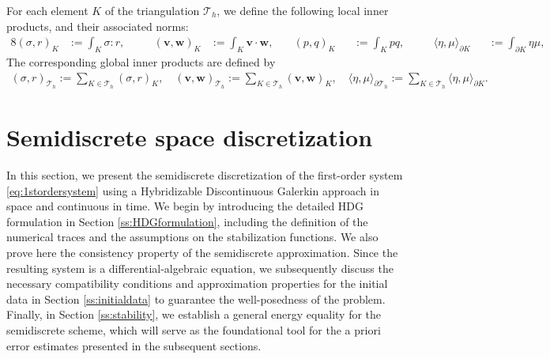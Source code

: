 \documentclass[10pt,letterpaper]{amsart}
\theoremstyle{plain} %
\theoremstyle{remark} %
\newcommand{\vect}[1]{\mathbf{#1}}
\newcommand{\Th}{\mathcal{T}_h} %
\newcommand{\Kprod}[2]{( #1, #2 )_{K}}
\newcommand{\pKprod}[2]{\langle #1, #2 \rangle_{\partial K}}
\newcommand{\Thprod}[2]{( #1, #2 )_{\mathcal{T}_h}}
\newcommand{\pThprod}[2]{\langle #1, #2 \rangle_{\partial \mathcal{T}_{h}}}
\begin{document}
For each element $K$ of the triangulation $\Th$, we define the following local inner products, and their associated norms:
\begin{alignat*}{8}
	\Kprod{\sigma}{r} &:= \int_K \sigma : r, 
	&&\quad
	\Kprod{\vect{v}}{\vect{w}} &:= \int_K \vect{v} \cdot \vect{w}, 
	&\quad
	\Kprod{p}{q} &&:= \int_K p q , 
	&&\quad
	\pKprod{\eta}{\mu}&&:= \int_{\partial K} \eta \mu,
	&&\quad
\end{alignat*}
The corresponding global inner products are defined by
\begin{align*}
	\Thprod{\sigma}{r} :=
	\sum_{K \in \Th} \Kprod{\sigma}{r}, \quad
	\Thprod{\vect{v}}{\vect{w}} := \sum_{K \in \Th} \Kprod{\vect{v}}{\vect{w}}, \quad
	\pThprod{\eta}{\mu}:=
	\sum_{K \in \Th} \pKprod{\eta}{\mu}.
\end{align*}




\section{Semidiscrete space discretization}
\label{sec:semidiscrete-discretization}

{
In this section, we present the semidiscrete discretization of the first-order system \eqref{eq:1stordersystem} using a Hybridizable Discontinuous Galerkin approach in space and continuous in time. We begin by introducing the detailed HDG formulation in Section \ref{ss:HDGformulation}, including the definition of the numerical traces and the assumptions on the stabilization functions. We also prove here the consistency property of the semidiscrete approximation. Since the resulting system is a differential-algebraic equation, we subsequently discuss the necessary compatibility conditions and approximation properties for the initial data in Section \ref{ss:initialdata} to guarantee the well-posedness of the problem. Finally, in Section \ref{ss:stability}, we establish a general energy equality for the semidiscrete scheme, which will serve as the foundational tool for the a priori error estimates presented in the subsequent sections.}
\end{document}
